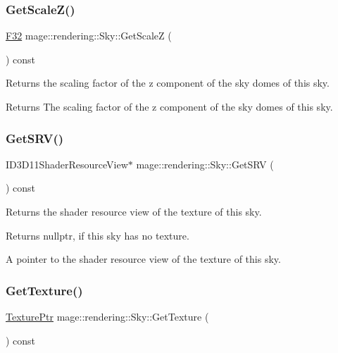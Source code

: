 \subsubsection{\texorpdfstring{Get\+Scale\+Z()}{GetScaleZ()}}
{\footnotesize\ttfamily \hyperlink{namespacemage_aa97e833b45f06d60a0a9c4fc22ae02c0}{F32} mage\+::rendering\+::\+Sky\+::\+Get\+ScaleZ (\begin{DoxyParamCaption}{ }\end{DoxyParamCaption}) const\hspace{0.3cm}{\ttfamily [noexcept]}}

Returns the scaling factor of the z component of the sky domes of this sky.

\begin{DoxyReturn}{Returns}
The scaling factor of the z component of the sky domes of this sky. 
\end{DoxyReturn}
\hypertarget{classmage_1_1rendering_1_1_sky_a8ded7262b242de3e76e4bdcd5a91f4c3}{}\label{classmage_1_1rendering_1_1_sky_a8ded7262b242de3e76e4bdcd5a91f4c3} 
\subsubsection{\texorpdfstring{Get\+S\+R\+V()}{GetSRV()}}
{\footnotesize\ttfamily I\+D3\+D11\+Shader\+Resource\+View$\ast$ mage\+::rendering\+::\+Sky\+::\+Get\+S\+RV (\begin{DoxyParamCaption}{ }\end{DoxyParamCaption}) const\hspace{0.3cm}{\ttfamily [noexcept]}}

Returns the shader resource view of the texture of this sky.

\begin{DoxyReturn}{Returns}
{\ttfamily nullptr}, if this sky has no texture. 

A pointer to the shader resource view of the texture of this sky. 
\end{DoxyReturn}
\hypertarget{classmage_1_1rendering_1_1_sky_a575698f7fafad47d544f88bf4e2eea5e}{}\label{classmage_1_1rendering_1_1_sky_a575698f7fafad47d544f88bf4e2eea5e} 
\subsubsection{\texorpdfstring{Get\+Texture()}{GetTexture()}}
{\footnotesize\ttfamily \hyperlink{namespacemage_1_1rendering_a6f3ae54f825328465b0cdde0f0de4a36}{Texture\+Ptr} mage\+::rendering\+::\+Sky\+::\+Get\+Texture (\begin{DoxyParamCaption}{ }\end{DoxyParamCaption}) const\hspace{0.3cm}{\ttfamily [noexcept]}}

